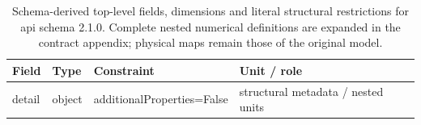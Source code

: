 \begin{table}[htbp]\centering\footnotesize
\caption{Schema-derived top-level fields, dimensions and literal structural restrictions for api schema 2.1.0. Complete nested numerical definitions are expanded in the contract appendix; physical maps remain those of the original model.}\label{tab:contract-api}
\begin{tabularx}{\textwidth}{@{}>{\raggedright\arraybackslash}p{}>{\raggedright\arraybackslash}p{}>{\raggedright\arraybackslash}X>{\raggedright\arraybackslash}X@{}}\toprule
Field & Type & Constraint & Unit / role\\\midrule
detail & object & additionalProperties=\allowbreak{}False & structural metadata /\allowbreak{} nested units\\
\bottomrule\end{tabularx}
\end{table}
